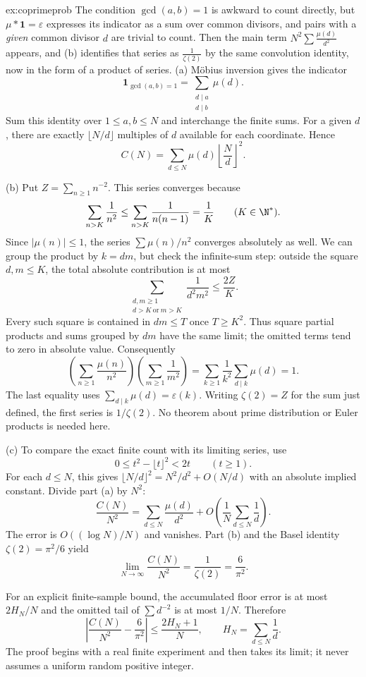 \begin{solution}{ex:coprimeprob}
\idea The condition $\gcd(a,b)=1$ is awkward to count directly, but $\mu*\mathbf 1=\varepsilon$ expresses its indicator as a sum over common divisors, and pairs with a \emph{given} common divisor $d$ are trivial to count. Then the main term $N^2\sum\frac{\mu(d)}{d^2}$ appears, and (b) identifies that series as $\frac1{\zeta(2)}$ by the same convolution identity, now in the form of a product of series.
\writeup (a) M\"obius inversion gives the indicator
\[
\mathbf1_{\gcd(a,b)=1}
=\sum_{\substack{d\mid a\\d\mid b}}\mu(d).
\]
Sum this identity over $1\le a,b\le N$ and interchange the finite sums. For a given $d$, there are exactly $\lfloor N/d\rfloor$ multiples of $d$ available for each coordinate. Hence
\[
C(N)=\sum_{d\le N}\mu(d)\left\lfloor\frac Nd\right\rfloor^2.
\]

(b) Put $Z=\sum_{n\ge1}n^{-2}$. This series converges because
\[
\sum_{n>K}\frac1{n^2}
\le\sum_{n>K}\frac1{n(n-1)}=\frac1K
\qquad(K\in\N^*).
\]
Since $|\mu(n)|\le1$, the series $\sum\mu(n)/n^2$ converges
absolutely as well. We can group the product by $k=dm$, but check
the infinite-sum step: outside the square $d,m\le K$, the total
absolute contribution is at most
\[
\sum_{\substack{d,m\ge1\\d>K\ \text{or}\ m>K}}
\frac1{d^2m^2}\le\frac{2Z}{K}.
\]
Every such square is contained in $dm\le T$ once $T\ge K^2$.
Thus square partial products and sums grouped by $dm$ have the same
limit; the omitted terms tend to zero in absolute value. Consequently
\[
\left(\sum_{n\ge1}\frac{\mu(n)}{n^2}\right)
\left(\sum_{m\ge1}\frac1{m^2}\right)
=\sum_{k\ge1}\frac1{k^2}\sum_{d\mid k}\mu(d)
=1.
\]
The last equality uses $\sum_{d\mid k}\mu(d)=\varepsilon(k)$.
Writing $\zeta(2)=Z$ for the sum just defined, the first series is
$1/\zeta(2)$. No theorem about prime distribution or Euler products
is needed here.

(c) To compare the exact finite count with its limiting series, use
\[
0\le t^2-\lfloor t\rfloor^2<2t
\qquad(t\ge1).
\]
For each $d\le N$, this gives
$\lfloor N/d\rfloor^2=N^2/d^2+O(N/d)$ with an absolute implied constant. Divide part (a) by $N^2$:
\[
\frac{C(N)}{N^2}
=\sum_{d\le N}\frac{\mu(d)}{d^2}
+O\left(\frac1N\sum_{d\le N}\frac1d\right).
\]
The error is $O((\log N)/N)$ and vanishes. Part (b) and the Basel identity $\zeta(2)=\pi^2/6$ yield
\[
\lim_{N\to\infty}\frac{C(N)}{N^2}
=\frac1{\zeta(2)}=\frac6{\pi^2}.
\]

For an explicit finite-sample bound, the accumulated floor error is at most $2H_N/N$ and the omitted tail of $\sum d^{-2}$ is at most $1/N$. Therefore
\[
\left|\frac{C(N)}{N^2}-\frac6{\pi^2}\right|
\le\frac{2H_N+1}{N},\qquad H_N=\sum_{d\le N}\frac1d.
\]
The proof begins with a real finite experiment and then takes its limit; it never assumes a uniform random positive integer.
\end{solution}

